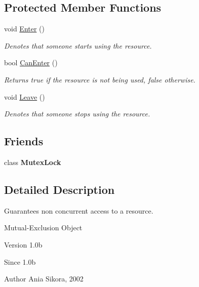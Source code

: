\subsection*{Protected Member Functions}
\begin{DoxyCompactItemize}
\item 
void \hyperlink{class_common_1_1_mutex_a08adde4760931f79a7ae7702cde3c034}{Enter} ()
\begin{DoxyCompactList}\small\item\em Denotes that someone starts using the resource. \end{DoxyCompactList}\item 
\hypertarget{class_common_1_1_mutex_a5b4ef7e61426f2e7c17e12449e55b353}{bool \hyperlink{class_common_1_1_mutex_a5b4ef7e61426f2e7c17e12449e55b353}{Can\-Enter} ()}\label{class_common_1_1_mutex_a5b4ef7e61426f2e7c17e12449e55b353}

\begin{DoxyCompactList}\small\item\em Returns true if the resource is not being used, false otherwise. \end{DoxyCompactList}\item 
void \hyperlink{class_common_1_1_mutex_a59b41bf53521202af2c59201cd078aab}{Leave} ()
\begin{DoxyCompactList}\small\item\em Denotes that someone stops using the resource. \end{DoxyCompactList}\end{DoxyCompactItemize}
\subsection*{Friends}
\begin{DoxyCompactItemize}
\item 
\hypertarget{class_common_1_1_mutex_a7177018259362468923e579d8525b5d5}{class {\bfseries Mutex\-Lock}}\label{class_common_1_1_mutex_a7177018259362468923e579d8525b5d5}

\end{DoxyCompactItemize}


\subsection{Detailed Description}
Guarantees non concurrent access to a resource. 

Mutual-\/\-Exclusion Object

\begin{DoxyVersion}{Version}
1.\-0b 
\end{DoxyVersion}
\begin{DoxySince}{Since}
1.\-0b 
\end{DoxySince}
\begin{DoxyAuthor}{Author}
Ania Sikora, 2002 
\end{DoxyAuthor}


